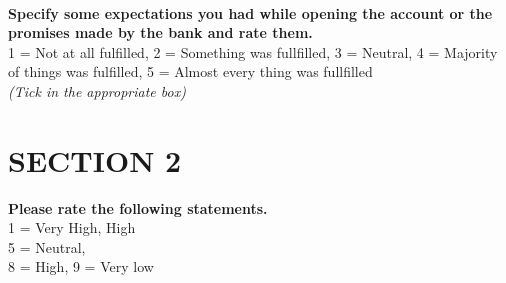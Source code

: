 \documentclass[11pt,a4paper]{article}
\newcommand \tab[1][1cm]{\hspace*{#1}}
\begin{document}
{\begin{minipage}{\textwidth}
\end{minipage}
\begin{minipage}{\textwidth}
\tab \\ 
\textbf { Specify some expectations you had while opening the account or the promises made by the bank and rate them. }\\
1 = Not at all fulfilled, 2 = Something was fullfilled, 3 = Neutral, 4 = Majority of things was fulfilled, 5 = Almost every thing was fullfilled\\
\emph {(Tick in the appropriate box)}\\
\end{minipage}
\newpage
\section*{SECTION 2}
\textbf{Please rate the following statements.}\\
1 = Very High, High\\
5 = Neutral,\\
8 = High, 9 = Very low
}
\end{document}

